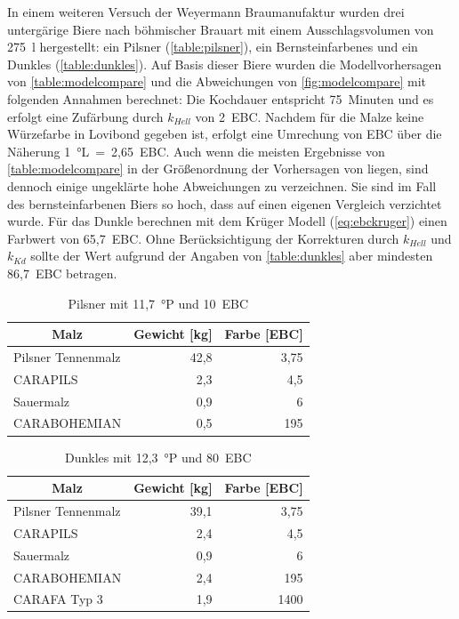 \documentclass[a4paper,parskip=half]{scrartcl}
\newcommand{\khell}{k_{Hell}}
\newcommand{\kkd}{k_{Kd}}
\begin{document}
In einem weiteren Versuch der Weyermann Braumanufaktur wurden drei untergärige Biere nach böhmischer Brauart mit einem Ausschlagsvolumen von 275~l hergestellt: ein Pilsner (\autoref{table:pilsner}), ein Bernsteinfarbenes und ein Dunkles (\autoref{table:dunkles}). Auf Basis dieser Biere wurden die Modellvorhersagen von \autoref{table:modelcompare} und die Abweichungen von \autoref{fig:modelcompare} mit folgenden Annahmen berechnet: Die Kochdauer entspricht 75~Minuten und es erfolgt eine Zufärbung durch $\khell$ von 2~EBC. Nachdem für die Malze keine Würzefarbe in Lovibond gegeben ist, erfolgt eine Umrechung von EBC über die Näherung 1~°L~=~2,65~EBC. Auch wenn die meisten Ergebnisse von \autoref{table:modelcompare} in der Größenordnung der Vorhersagen von \textcite{KrausWeyermann2022} liegen, sind dennoch einige ungeklärte hohe Abweichungen zu verzeichnen. Sie sind im Fall des bernsteinfarbenen Biers so hoch, dass auf einen eigenen Vergleich verzichtet wurde. Für das Dunkle berechnen \textcite{KrausWeyermann2022} mit dem Krüger Modell (\autoref{eq:ebckruger}) einen Farbwert von 65,7~EBC. Ohne Berücksichtigung der Korrekturen durch $\khell$ und $\kkd$ sollte der Wert aufgrund der Angaben von \autoref{table:dunkles} aber mindesten 86,7~EBC betragen.

\begin{table}[H]
\centering
\begin{tabular}{lrr}
\toprule
\multicolumn{1}{c}{\textbf{Malz}} & \multicolumn{1}{c}{\textbf{Gewicht [kg]}} & \multicolumn{1}{c}{\textbf{Farbe [EBC]}} \\
\midrule
Pilsner Tennenmalz & 42,8 & 3,75 \\
CARAPILS & 2,3 & 4,5 \\
Sauermalz & 0,9 & 6 \\
CARABOHEMIAN & 0,5 & 195 \\
\bottomrule
\end{tabular}
\caption{Pilsner mit 11,7~°P und 10~EBC \parencite{KrausWeyermann2022}}
\label{table:pilsner}
\end{table}

\begin{table}[H]
\centering
\begin{tabular}{lrr}
\toprule
\multicolumn{1}{c}{\textbf{Malz}} & \multicolumn{1}{c}{\textbf{Gewicht [kg]}} & \multicolumn{1}{c}{\textbf{Farbe [EBC]}} \\
\midrule
Pilsner Tennenmalz & 39,1 & 3,75 \\
CARAPILS & 2,4 & 4,5 \\
Sauermalz & 0,9 & 6 \\
CARABOHEMIAN & 2,4 & 195 \\
CARAFA Typ 3 & 1,9 & 1400 \\
\bottomrule
\end{tabular}
\caption{Dunkles mit 12,3~°P und 80~EBC \parencite{KrausWeyermann2022}}
\label{table:dunkles}
\end{table}
\end{document}
